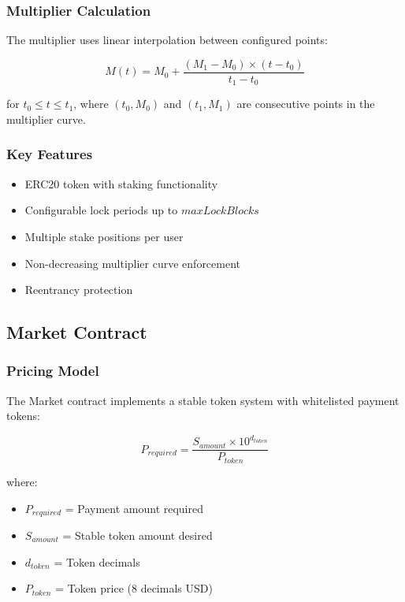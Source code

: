 \documentclass[11pt,a4paper]{article}
\begin{document}
\subsubsection{Multiplier Calculation}

The multiplier uses linear interpolation between configured points:

\begin{equation}
M(t) = M_0 + \frac{(M_1 - M_0) \times (t - t_0)}{t_1 - t_0}
\end{equation}

for $t_0 \leq t \leq t_1$, where $(t_0, M_0)$ and $(t_1, M_1)$ are consecutive points in the multiplier curve.

\subsubsection{Key Features}
\begin{itemize}
\item ERC20 token with staking functionality
\item Configurable lock periods up to $maxLockBlocks$
\item Multiple stake positions per user
\item Non-decreasing multiplier curve enforcement
\item Reentrancy protection
\end{itemize}

\subsection{Market Contract}

\subsubsection{Pricing Model}

The Market contract implements a stable token system with whitelisted payment tokens:

\begin{equation}
P_{required} = \frac{S_{amount} \times 10^{d_{token}}}{P_{token}}
\end{equation}

where:
\begin{itemize}
\item $P_{required}$ = Payment amount required
\item $S_{amount}$ = Stable token amount desired
\item $d_{token}$ = Token decimals
\item $P_{token}$ = Token price (8 decimals USD)
\end{itemize}
\end{document}

